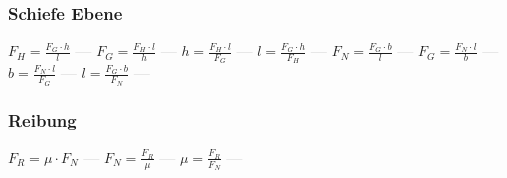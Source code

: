\subsubsection{Schiefe Ebene} 
\begin{minipage}{0.45\textwidth} 
\end{minipage} 
\begin{minipage}{0.45\textwidth} 
 
\end{minipage} 
$ F_{H}  = \frac{F_{G} \cdot h}{ l} $ \textcolor{lightgray}{\textbf{---}} 
$ F_{G}  = \frac{F_{H} \cdot l}{ h} $ \textcolor{lightgray}{\textbf{---}} 
$ h = \frac{F_{H} \cdot l}{ F_{G} } $ \textcolor{lightgray}{\textbf{---}} 
$ l = \frac{F_{G} \cdot h}{ F_{H} } $ \textcolor{lightgray}{\textbf{---}} 
$ F_{N}  = \frac{F_{G} \cdot b}{ l} $ \textcolor{lightgray}{\textbf{---}} 
$ F_{G}  = \frac{F_{N} \cdot l}{ b} $ \textcolor{lightgray}{\textbf{---}} 
$ b = \frac{F_{N} \cdot l}{ F_{G} } $ \textcolor{lightgray}{\textbf{---}} 
$ l = \frac{F_{G} \cdot b}{ F_{N} } $ \textcolor{lightgray}{\textbf{---}} 

\subsubsection{Reibung} 
\begin{minipage}{0.45\textwidth} 
\end{minipage} 
\begin{minipage}{0.45\textwidth} 
 
\end{minipage} 
$ F_{R}  = \mu \cdot F_{N} $ \textcolor{lightgray}{\textbf{---}} 
$ F_{N}  = \frac{F_{R} }{\mu } $ \textcolor{lightgray}{\textbf{---}} 
$ \mu  = \frac{F_{R} }{F_{N} } $ \textcolor{lightgray}{\textbf{---}} 

